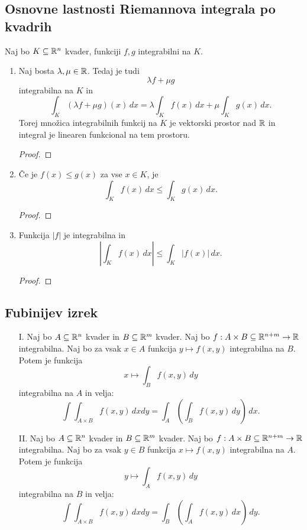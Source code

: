\subsection{Osnovne lastnosti Riemannova integrala po kvadrih}
Naj bo \(K \subseteq \mathbb{R}^n\) kvader, funkciji \(f, g\) integrabilni na \(K\).
\begin{enumerate}
    \item Naj bosta \(\lambda, \mu \in \mathbb{R}\). Tedaj je tudi 
    \[\lambda f + \mu g\]
    integrabilna na \(K\) in
    \[\int_K (\lambda f + \mu g)(x) \, dx = \lambda \int_K f(x) \, dx + \mu  \int_K g(x) \, dx.\]
    Torej množica integrabilnih funkcij na \(K\) je vektorski prostor nad \(\mathbb{R}\) in integral je linearen funkcional na tem prostoru.
    \begin{proof}
        \todo{}
    \end{proof}
    \item Če je \(f(x) \leq g(x)\) za vse \(x \in K\), je \[\int_K f(x) \, dx \leq \int_K g(x) \, dx.\]
    \begin{proof}
        \todo{}
    \end{proof}
    \item Funkcija \(|f|\) je integrabilna in \[\left|\int_K f(x) \, dx\right| \leq \int_K |f(x)| \, dx.\]
    \begin{proof}
        \todo{}
    \end{proof}
\end{enumerate}

\newpage
\subsection{Fubinijev izrek}
\begin{enumerate}
    \item[I.] Naj bo \(A \subseteq \mathbb{R}^n\) kvader in \(B \subseteq \mathbb{R}^m\) kvader. Naj bo \(f: A \times B \subseteq \mathbb{R}^{n+m} \to \mathbb{R}\) integrabilna. Naj bo za vsak \(x \in A\) funkcija \(y \mapsto f(x,y)\) integrabilna na \(B\). Potem je funkcija \[x \mapsto \int_B f(x,y) \, dy\]
    integrabilna na \(A\) in velja: \[\int \int_{A \times B} f(x,y) \, dxdy = \int_A \left(\int_B f(x,y) \, dy\right) \, dx.\]
    \item[II.] Naj bo \(A \subseteq \mathbb{R}^n\) kvader in \(B \subseteq \mathbb{R}^m\) kvader. Naj bo \(f: A \times B \subseteq \mathbb{R}^{n+m} \to \mathbb{R}\) integrabilna. Naj bo za vsak \(y \in B\) funkcija \(x \mapsto f(x,y)\) integrabilna na \(A\). Potem je funkcija \[y \mapsto \int_A f(x,y) \, dy\]
    integrabilna na \(B\) in velja: \[\int \int_{A \times B} f(x,y) \, dxdy = \int_B \left(\int_A f(x,y) \, dx\right) \, dy.\]
\end{enumerate}

